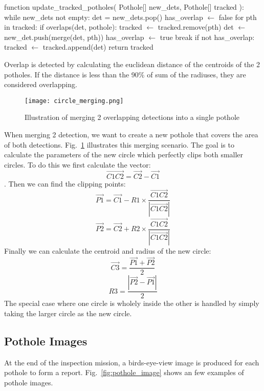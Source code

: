 \documentclass[conference]{IEEEtran}
\begin{document}
\begin{algorithm}[caption={Merge New Detection with Tracked Potholes}, label={alg1}]
function update_tracked_potholes(
    Pothole[] new_dets,
    Pothole[] tracked
):
    while new_dets not empty:
        det = new_dets.pop()
        has_overlap $\gets$ false
        for pth in tracked:
            if overlaps(det, pothole):
                tracked $\gets$ tracked.remove(pth)
                det $\gets$ new_det.push(merge(det, pth))
                has_overlap $\gets$ true
                break
        if not has_overlap:
            tracked $\gets$ tracked.append(det)
    return tracked
\end{algorithm}

Overlap is detected by calculating the euclidean distance of the centroids of the 2 potholes. If the distance is less than the 90\% of sum of the radiuses, they are considered overlapping.

\begin{figure}[h]
    \centering
    \texttt{[image: circle\_merging.png]}
    \caption{Illustration of merging 2 overlapping detections into a single pothole}
    \label{fig:merging}
\end{figure}

When merging 2 detection, we want to create a new pothole that covers the area of both detections. Fig.~\ref{fig:merging} illustrates this merging scenario. The goal is to calculate the parameters of the new circle which perfectly clips both smaller circles. To do this we first calculate the vector:
 \[\overrightarrow{C1C2} = \overrightarrow{C2} - \overrightarrow{C1}\].
Then we can find the clipping points:
\[\overrightarrow{P1} = \overrightarrow{C1} -  R1 \times \frac{\overrightarrow{C1C2}}{|\overrightarrow{C1C2}|}\]
\[\overrightarrow{P2} = \overrightarrow{C2} + R2 \times \frac{\overrightarrow{C1C2}}{|\overrightarrow{C1C2}|}\]
Finally we can calculate the centroid and radius of the new circle:
\[\overrightarrow{C3} = \frac{\overrightarrow{P1} + \overrightarrow{P2}}{2}\]
\[R3 = \frac{|\overrightarrow{P2} - \overrightarrow{P1}|}{2}\]
The special case where one circle is wholely inside the other is handled by simply taking the larger circle as the new circle.

\subsection{Pothole Images}

At the end of the inspection mission, a birds-eye-view image is produced for each pothole to form a report. Fig.~\ref{fig:pothole_image} shows an few examples of pothole images.
\end{document}
